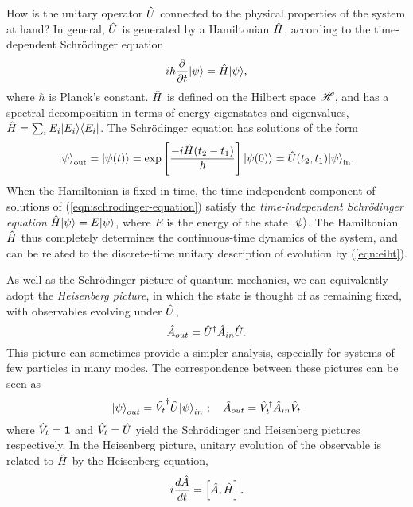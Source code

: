 How is the unitary operator $\hat{U}$ connected to the physical properties of the system at hand?
In general, $\hat{U}$ is generated by a Hamiltonian $\hat{H}$, according to the time-dependent Schr\"odinger equation
\begin{equation}
   i \hbar \frac{\partial}{\partial t} \mbox{$ | \psi \rangle $} = \hat{H} \mbox{$ | \psi \rangle $},
   \label{eqn:schrodinger-equation}
\end{equation}
where $\hbar$ is Planck's constant. $\hat{H}$ is defined on the Hilbert space $\mathscr{H}$, and has a spectral decomposition in terms of energy eigenstates and eigenvalues, $\hat{H} = \sum_i E_i \mbox{$ | E_i \rangle $}\mbox{$ \langle E_i | $}$. The Schr\"odinger equation has solutions of the form
\begin{equation}
    \mbox{$ | \psi \rangle $}_{\mathrm{out}} = \mbox{$ | \psi(t) \rangle $} = 
    \mathrm{exp} \left[ \frac{-i \hat{H} (t_2-t_1) }{\hbar} \right]
    \mbox{$ | \psi(0) \rangle $}
    = \hat{U}(t_2, t_1) \mbox{$ | \psi \rangle $}_{\mathrm{in}}.
    \label{eqn:eiht}
\end{equation}
When the Hamiltonian is fixed in time, the time-independent component of solutions of (\ref{eqn:schrodinger-equation}) satisfy the \emph{time-independent Schr\"odinger equation}
$\hat{H} \mbox{$ | \psi \rangle $}  = E \mbox{$ | \psi \rangle $}$,
where $E$ is the energy of the state $\mbox{$ | \psi \rangle $}$. 
The Hamiltonian $\hat{H}$ thus completely determines the continuous-time dynamics of the system, and can be related to the discrete-time unitary description of evolution  by (\ref{eqn:eiht}).

As well as the Schr\"odinger picture of quantum mechanics, we can equivalently adopt the \emph{Heisenberg picture}, in which the state is thought of as remaining fixed, with observables evolving under $\hat{U}$,
\begin{equation}
\hat{A}_{out} = \hat{U}^\dagger \hat{A}_{in} \hat{U}.
\end{equation}
This picture can sometimes provide a simpler analysis, especially for systems of few particles in many modes. The correspondence between these pictures can be seen as
\begin{equation}
    \mbox{$ | \psi \rangle $}_{out} = \hat{V_t}^\dagger \hat{U} \mbox{$ | \psi \rangle $}_{in} ~; \quad \hat{A}_{out} = \hat{V}_t^\dagger \hat{A}_{in} \hat{V}_t
\end{equation}
where $\hat{V}_t = \mathbf{1}$ and $\hat{V}_t = \hat{U}$ yield the Schr\"odinger and Heisenberg pictures respectively.
In the Heisenberg picture, unitary evolution of the observable is related to $\hat{H}$ by the Heisenberg equation,
\begin{equation}
   i\frac{d\hat{A}}{dt} = \left[ \hat{A}, \hat{H} \right].
   \label{eqn:heisenberg-equation}
\end{equation}

